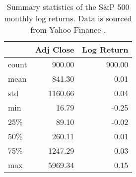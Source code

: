 \begin{table}[ht]
\centering
{%
\begin{tabular}{lrr}
\toprule
 & Adj Close & Log Return \\
\midrule
count & 900.00 & 900.00 \\
mean & 841.30 & 0.01 \\
std & 1160.66 & 0.04 \\
min & 16.79 & -0.25 \\
25\% & 89.10 & -0.02 \\
50\% & 260.11 & 0.01 \\
75\% & 1247.29 & 0.03 \\
max & 5969.34 & 0.15 \\
\bottomrule
\end{tabular}
}
\caption{Summary statistics of the S\&P 500 monthly log returns. Data is sourced from Yahoo Finance \citep{yahoo_finance_gspc}.}
\label{tab:sp500_returns_summary}
\end{table}